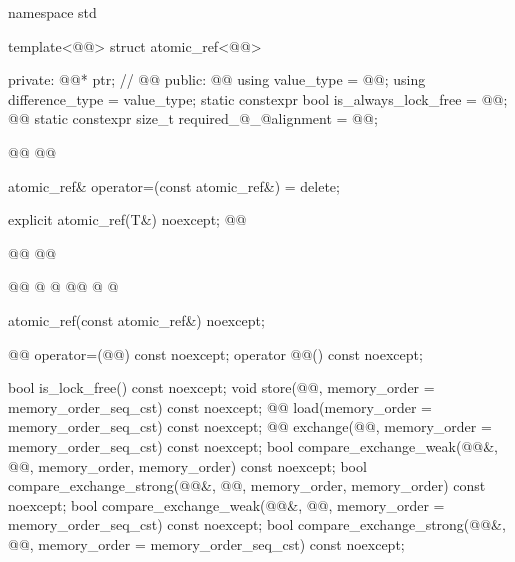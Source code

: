 \begin{codeblock}
namespace std {
  template<@@> struct atomic_ref<@@> {
  private:
    @@* ptr;        // \expos
    @@
  public:
    @@
    using value_type = @@;
    using difference_type = value_type;
    static constexpr bool is_always_lock_free = @@;
    @@
    static constexpr size_t required_@_@alignment = @@;

    @@
    @@

    atomic_ref& operator=(const atomic_ref&) = delete;

    explicit atomic_ref(T&) noexcept;
    @@
    
    @@
    @@
    
    @@
    @  @
    @@
    @  @

    atomic_ref(const atomic_ref&) noexcept;

    @@ operator=(@@) const noexcept;
    operator @@() const noexcept;

    bool is_lock_free() const noexcept;
    void store(@@, memory_order = memory_order_seq_cst) const noexcept;
    @@ load(memory_order = memory_order_seq_cst) const noexcept;
    @@ exchange(@@,
                      memory_order = memory_order_seq_cst) const noexcept;
    bool compare_exchange_weak(@@&, @@,
                               memory_order, memory_order) const noexcept;
    bool compare_exchange_strong(@@&, @@,
                                 memory_order, memory_order) const noexcept;
    bool compare_exchange_weak(@@&, @@,
                               memory_order = memory_order_seq_cst) const noexcept;
    bool compare_exchange_strong(@@&, @@,
                                 memory_order = memory_order_seq_cst) const noexcept;

}}
\end{codeblock}
